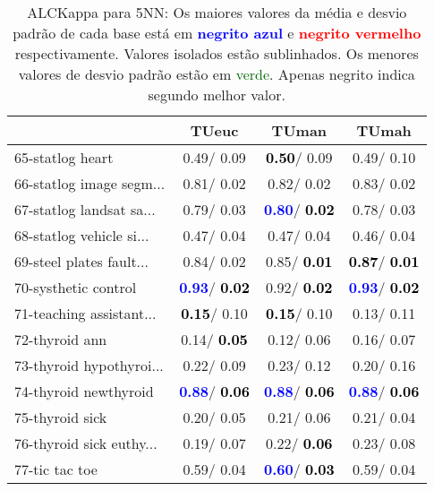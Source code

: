 \begin{table}[h]
\caption{ALCKappa para 5NN: Os maiores valores da média e desvio padrão de cada base está em \textcolor{blue}{\textbf{negrito azul}} e \textcolor{red}{\textbf{negrito vermelho}} respectivamente. Valores isolados estão sublinhados. Os menores valores de desvio padrão estão em \textcolor{darkgreen}{verde}. Apenas negrito indica segundo melhor valor.}
\begin{center}\begin{tabular}{lc|c|c}
 & TUeuc & TUman & TUmah\\ \hline 65-statlog heart &   0.49/  0.09 & \textcolor{black}{\textbf{  0.50}}/  0.09 &   0.49/  0.10 \\
66-statlog image segm... &   0.81/  0.02 &   0.82/  0.02 &   0.83/  0.02 \\
67-statlog landsat sa... &   0.79/  0.03 & \textcolor{blue}{\textbf{  0.80}}/\textcolor{black}{\textbf{  0.02}} &   0.78/  0.03 \\
68-statlog vehicle si... &   0.47/  0.04 &   0.47/  0.04 &   0.46/  0.04 \\
69-steel plates fault... &   0.84/  0.02 &   0.85/\textcolor{black}{\textbf{  0.01}} & \textcolor{black}{\textbf{  0.87}}/\textcolor{black}{\textbf{  0.01}} \\
70-systhetic control & \textcolor{blue}{\textbf{  0.93}}/\textcolor{black}{\textbf{  0.02}} &   0.92/\textcolor{black}{\textbf{  0.02}} & \textcolor{blue}{\textbf{  0.93}}/\textcolor{black}{\textbf{  0.02}} \\
71-teaching assistant... & \textcolor{black}{\textbf{  0.15}}/  0.10 & \textcolor{black}{\textbf{  0.15}}/  0.10 &   0.13/  0.11 \\ \hline
72-thyroid ann &   0.14/\textcolor{black}{\textbf{  0.05}} &   0.12/  0.06 &   0.16/  0.07 \\
73-thyroid hypothyroi... &   0.22/  0.09 &   0.23/  0.12 &   0.20/  0.16 \\
74-thyroid newthyroid & \textcolor{blue}{\textbf{  0.88}}/\textcolor{black}{\textbf{  0.06}} & \textcolor{blue}{\textbf{  0.88}}/\textcolor{black}{\textbf{  0.06}} & \textcolor{blue}{\textbf{  0.88}}/\textcolor{black}{\textbf{  0.06}} \\
75-thyroid sick &   0.20/  0.05 &   0.21/  0.06 &   0.21/  0.04 \\
76-thyroid sick euthy... &   0.19/  0.07 &   0.22/\textcolor{black}{\textbf{  0.06}} &   0.23/  0.08 \\
77-tic tac toe &   0.59/  0.04 & \textcolor{blue}{\textbf{  0.60}}/\textcolor{black}{\textbf{  0.03}} &   0.59/  0.04 \\

\end{tabular}
\end{center}
\end{table}
